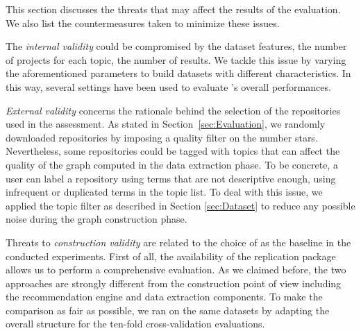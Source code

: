 
This section discusses the threats that may affect the results of the evaluation. We also list the countermeasures taken to minimize these issues.

The \emph{internal validity} could be compromised by the dataset features, \ie the number of projects for each topic, the number of results. We tackle this issue by varying the aforementioned parameters to build datasets with different characteristics. In this way, several settings have been used to evaluate \TF's overall performances.

\emph{External validity} concerns the rationale behind the selection of the \GH 
repositories used in the assessment. As stated in Section~\ref{sec:Evaluation}, we randomly downloaded repositories by imposing a 
quality filter on the number stars. Nevertheless, some repositories could be 
tagged with topics that can affect the quality of the graph computed in the 
data extraction phase. To be concrete, a user can label a repository using 
terms that are not descriptive enough, \ie using infrequent or duplicated terms 
in the topic list. To deal with this issue, we applied the topic filter as 
described in Section \ref{sec:Dataset} to reduce any possible noise during the 
graph construction phase.

Threats to \emph{construction validity} are related to the choice of \MNB as the baseline in the conducted experiments. First of all, the availability of the replication package allows us to perform a comprehensive evaluation. %
As we claimed before, the two approaches are strongly different from the construction point of view including the recommendation engine and data extraction components. To make the comparison as fair as possible, we ran \MNB on the same datasets by adapting the overall structure for the ten-fold cross-validation evaluations.